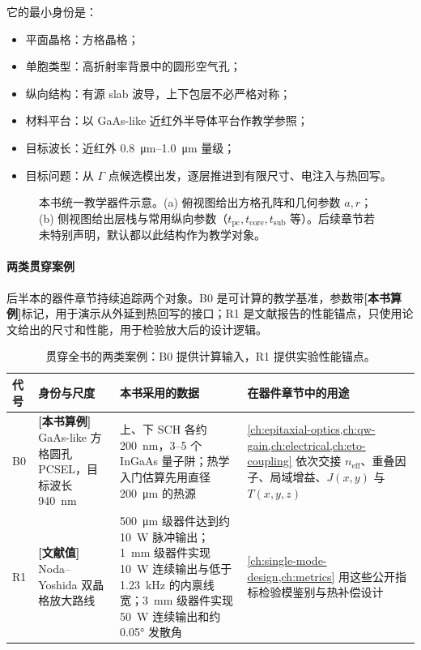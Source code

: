 它的最小身份是：
\begin{itemize}
  \item 平面晶格：方格晶格；
  \item 单胞类型：高折射率背景中的圆形空气孔；
  \item 纵向结构：有源 slab 波导，上下包层不必严格对称；
  \item 材料平台：以 GaAs-like 近红外半导体平台作教学参照；
  \item 目标波长：近红外 \SIrange{0.8}{1.0}{\micro\meter} 量级；
  \item 目标问题：从 $\Gamma$ 点候选模出发，逐层推进到有限尺寸、电注入与热回写。
\end{itemize}

\begin{figure}[htbp]
  \centering
  
  \caption{本书统一教学器件示意。(a) 俯视图给出方格孔阵和几何参数 $a,r$；(b) 侧视图给出层栈与常用纵向参数（$t_{\mathrm{pc}},t_{\mathrm{core}},t_{\mathrm{sub}}$ 等）。后续章节若未特别声明，默认都以此结构作为教学对象。}
  \label{fig:ch02_benchmark_device}
\end{figure}

\paragraph{两类贯穿案例}
后半本的器件章节持续追踪两个对象。B0 是可计算的教学基准，参数带\textbf{[本书算例]}标记，用于演示从外延到热回写的接口；R1 是文献报告的性能锚点，只使用论文给出的尺寸和性能，用于检验放大后的设计逻辑。

\begin{table}[htbp]
  \centering
  \small
  \caption{贯穿全书的两类案例：B0 提供计算输入，R1 提供实验性能锚点。}
  \label{tab:benchmark_pair}
  \setlength{\tabcolsep}{4pt}
  \begin{tabularx}{\textwidth}{@{}p{1.0cm}p{3.2cm}YY@{}}
    \toprule
    代号 & 身份与尺度 & 本书采用的数据 & 在器件章节中的用途 \\
    \midrule
    B0 & \textbf{[本书算例]} GaAs-like 方格圆孔 PCSEL，目标波长 \SI{940}{nm} & 上、下 SCH 各约 \SI{200}{nm}，3--5 个 InGaAs 量子阱；热学入门估算先用直径 \SI{200}{\micro\meter} 的热源 & \cref{ch:epitaxial-optics,ch:qw-gain,ch:electrical,ch:eto-coupling} 依次交接 $n_{\mathrm{eff}}$、重叠因子、局域增益、$J(x,y)$ 与 $T(x,y,z)$ \\
    R1 & \textbf{[文献值]} Noda--Yoshida 双晶格放大路线 & \SI{500}{\micro\meter} 级器件达到约 \SI{10}{W} 脉冲输出；\SI{1}{mm} 级器件实现 \SI{10}{W} 连续输出与低于 \SI{1.23}{kHz} 的内禀线宽；\SI{3}{mm} 级器件实现 \SI{50}{W} 连续输出和约 \ang{0.05} 发散角\cite{yoshida2019,yoshida2023,noda2023tutorial} & \cref{ch:single-mode-design,ch:metrics} 用这些公开指标检验模鉴别与热补偿设计 \\
    \bottomrule
  \end{tabularx}
\end{table}

